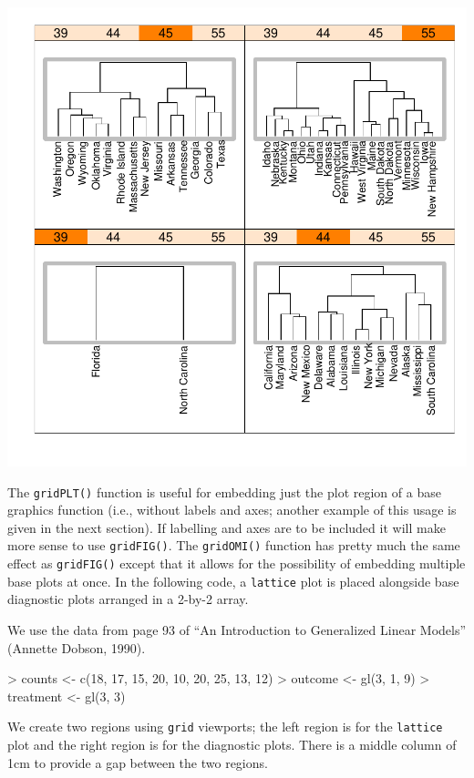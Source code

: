 \documentclass[a4paper]{article}
\newcommand{\grid}{{\tt grid}}
\newcommand{\lattice}{{\tt lattice}}
\begin{document}
\includegraphics{gridBase-013}

The \verb|gridPLT()| function is useful for embedding just the
plot region of a base graphics function (i.e., without labels and
axes;  another example of this usage 
is given in the next section).  If labelling
and axes are to be included it will make more sense to use
\verb|gridFIG()|.  The \verb|gridOMI()| function has pretty much
the same effect as \verb|gridFIG()| except that it allows for the
possibility of embedding multiple base plots at once.  In the
following code, a \lattice{} plot is placed alongside 
base diagnostic plots arranged in a 2-by-2 array.

We use the data from page 93 of
``An Introduction to Generalized Linear Models'' (Annette Dobson, 1990).

\begin{Schunk}
\begin{Sinput}
> counts <- c(18, 17, 15, 20, 10, 20, 25, 13, 12)
> outcome <- gl(3, 1, 9)
> treatment <- gl(3, 3)
\end{Sinput}
\end{Schunk}
We create two regions using \grid{} viewports;  the left region
is for the \lattice{} plot and the right region is for the diagnostic
plots.  There is a middle column of 1cm to provide a gap between
the two regions.
\end{document}
